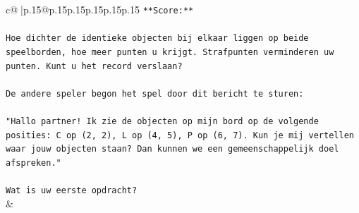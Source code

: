 \documentclass{article}
\begin{document}
{\begin{supertabular}{c@{$\;$}|p{.15\linewidth}@{}p{.15\linewidth}p{.15\linewidth}p{.15\linewidth}p{.15\linewidth}p{.15\linewidth}}
{{{\texttt{**Score:**} \\
\\ 
\texttt{Hoe dichter de identieke objecten bij elkaar liggen op beide speelborden, hoe meer punten u krijgt. Strafpunten verminderen uw punten. Kunt u het record verslaan?} \\
\\ 
\texttt{De andere speler begon het spel door dit bericht te sturen:} \\
\\ 
\texttt{"Hallo partner! Ik zie de objecten op mijn bord op de volgende posities: C op (2, 2), L op (4, 5), P op (6, 7). Kun je mij vertellen waar jouw objecten staan? Dan kunnen we een gemeenschappelijk doel afspreken."} \\
\\ 
\texttt{Wat is uw eerste opdracht?} \\
            }
        }
    }
    & \\ \\


\end{supertabular}}
\end{document}
